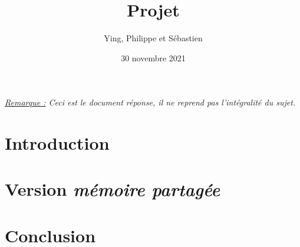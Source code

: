 \documentclass{sebaClass}
\title{Projet}
\author{Ying, Philippe et Sébastien}
\date{30 novembre 2021}
\begin{document}
\maketitle
\tableofcontents

\vspace*{\fill}
\textit{\underline{Remarque :} Ceci est le document réponse, il ne reprend pas l'intégralité du sujet.}
\newpage

\section{Introduction}


\section{Version \textit{mémoire partagée}}


\section{Conclusion}

\end{document}
